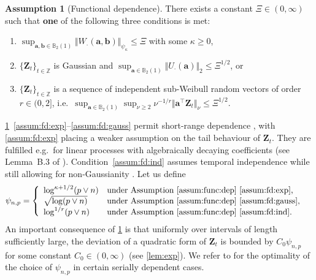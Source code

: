 \documentclass[11pt, a4paper]{article}
\newcommand{\mbf}{\mathbf}
\renewcommand{\l}{\left}
\renewcommand{\r}{\right}
\newcommand{\Z}{\mathbb{Z}}
\theoremstyle{definition}
\theoremstyle{definition}
\theoremstyle{definition}
\theoremstyle{definition}
\theoremstyle{definition}
\newtheorem{assum}{Assumption}
\theoremstyle{remark}
\theoremstyle{definition}
\theoremstyle{definition}
\theoremstyle{definition}
\begin{document}
\begin{assum}[Functional dependence]
	\label{assum:func:dep}
	There exists a constant $\Xi \in (0, \infty)$ such that {\bf one} of the following three conditions is met: 
	\begin{enumerate}[wide, label = (\roman*)]
		\item \label{assum:fd:exp} $\sup_{\mbf a, \mbf b \in \mathbb{B}_2(1)} \Vert W_{\cdot}(\mbf a, \mbf b) \Vert_{\psi_\kappa} \le \Xi$ with some $\kappa \ge 0$, 
  
		\item \label{assum:fd:gauss} $\{\mbf Z_t\}_{t \in \Z}$ is Gaussian and $\sup_{\mbf a \in \mathbb{B}_2(1)} \Vert U_{\cdot}(\mbf a) \Vert_2 \le \Xi^{1/2}$, or 
  \item \label{assum:fd:ind}
$\{\mbf Z_t\}_{t \in \Z}$ is a sequence of independent sub-Weibull random vectors of order $r \in (0, 2]$, i.e.\ $\sup_{\mbf a \in \mathbb{B}_2(1)} \sup_{\nu \ge 2} \nu^{-1/r} \Vert \mbf a^\top \mbf Z_t \Vert_\nu \le \Xi^{1/2}$. 
\end{enumerate}
\end{assum}

\cref{assum:func:dep}~\ref{assum:fd:exp}--\ref{assum:fd:gauss} permit short-range dependence \citep{wu2016performance}, with \ref{assum:fd:exp} placing a weaker assumption on the tail behaviour of $\mbf Z_t$.
They are fulfilled e.g.\ for linear processes with algebraically decaying coefficients (see Lemma~B.3 of \citealp{cho2022high}).
Condition~\ref{assum:fd:ind} assumes temporal independence while still allowing for non-Gaussianity \citep{KuCh22}. 
Let us define
\begin{align}
\psi_{n, p} &= \l\{\begin{array}{ll}
\log^{\kappa + 1/2}(p \vee n) & \text{under Assumption~\ref{assum:func:dep}~\ref{assum:fd:exp},}  \\
\sqrt{\log(p \vee n)} & \text{under Assumption~\ref{assum:func:dep}~\ref{assum:fd:gauss},}  \\
\log^{1/r}(p \vee n) & \text{under Assumption~\ref{assum:func:dep}~\ref{assum:fd:ind}.}  \\
\end{array}
\r. 
\label{eq:psi}
\end{align}
An important consequence of \cref{assum:func:dep} is that uniformly over intervals of length sufficiently large, the deviation of a quadratic form of $\mbf Z_t$ is bounded by $C_0 \psi_{n, p}$ for some constant $C_0 \in (0, \infty)$ (see \cref{lem:exp}).
We refer to \citet[Remark~4]{wu2016performance} for the optimality of the choice of $\psi_{n, p}$ in certain serially dependent cases.
\end{document}
